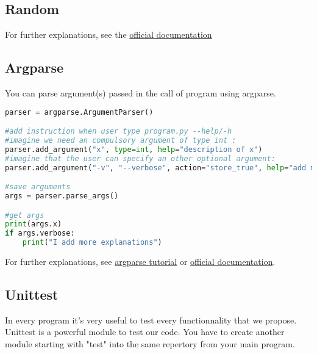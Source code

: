 \documentclass[a4paper, 12pt, titlepage]{scrartcl} %
\begin{document}
\subsection{Random}
For further explanations, see the \href{https://docs.python.org/3/library/random.html}{official documentation}

\subsection{Argparse}
You can parse argument(s) passed in the call of program using argparse.
\begin{lstlisting}[language=Python]
parser = argparse.ArgumentParser()

#add instruction when user type program.py --help/-h
#imagine we need an compulsory argument of type int :
parser.add_argument("x", type=int, help="description of x")
#imagine that the user can specify an other optional argument:
parser.add_argument("-v", "--verbose", action="store_true", help="add more explanation")

#save arguments
args = parser.parse_args()

#get args
print(args.x)
if args.verbose:
    print("I add more explanations")
\end{lstlisting}
For further explanations, see \href{http://www.sharelatex.com}{argparse tutorial} or  \href{https://docs.python.org/3/library/argparse.html}{official documentation}.


\subsection{Unittest}
In every program it's very useful to test every functionnality that we propose. Unittest is a powerful module to test our code. You have to create another module starting with "test" into the same repertory from your main program.
\end{document}
